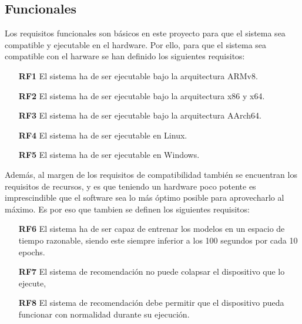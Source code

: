 \subsection{Funcionales}
Los requisitos funcionales son básicos en este proyecto para que el sistema sea compatible y ejecutable en el hardware. Por ello, para que el sistema sea compatible con el harware se han definido los siguientes requisitos:
\begin{itemize}
    \item [\textbf{RF1}] El sistema ha de ser ejecutable bajo la arquitectura ARMv8.
    \item [\textbf{RF2}] El sistema ha de ser ejecutable bajo la arquitectura x86 y x64.
    \item [\textbf{RF3}] El sistema ha de ser ejecutable bajo la arquitectura AArch64.
    \item [\textbf{RF4}] El sistema ha de ser ejecutable en Linux.
    \item [\textbf{RF5}] El sistema ha de ser ejecutable en Windows.
\end{itemize}

Además, al margen de los requisitos de compatibilidad también se encuentran los requisitos de recursos, y es que teniendo un hardware poco potente es imprescindible que el software sea lo más óptimo posible para aprovecharlo al máximo. Es por eso que tambien se definen los siguientes requisitos:
\begin{itemize}
    \item [\textbf{RF6}] El sistema ha de ser capaz de entrenar los modelos en un espacio de tiempo razonable, siendo este siempre inferior a los 100 segundos por cada 10 epochs.
    \item [\textbf{RF7}] El sistema de recomendación no puede colapsar el dispositivo que lo ejecute,
    \item [\textbf{RF8}] El sistema de recomendación debe permitir que el dispositivo pueda funcionar con normalidad durante su ejecución.
\end{itemize}